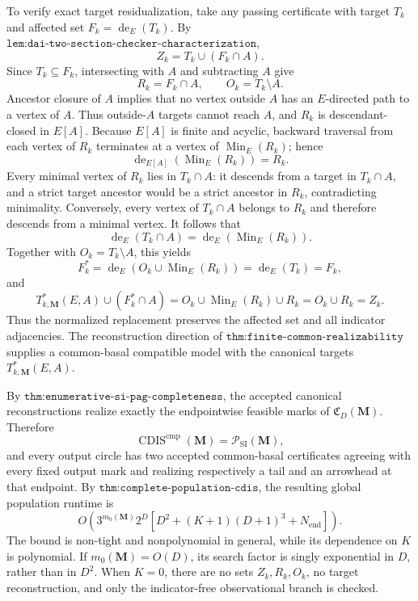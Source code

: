 To verify exact target residualization, take any passing certificate with target \(T_k\) and affected set \(F_k=\operatorname{de}_E(T_k)\).  By \(\texttt{lem:dai-two-section-checker-characterization}\),
\[
Z_k=T_k\cup(F_k\cap A).
\]
Since \(T_k\subseteq F_k\), intersecting with \(A\) and subtracting \(A\) give
\[
R_k=F_k\cap A,
\qquad
O_k=T_k\setminus A.
\]
Ancestor closure of \(A\) implies that no vertex outside \(A\) has an \(E\)-directed path to a vertex of \(A\).  Thus outside-\(A\) targets cannot reach \(A\), and \(R_k\) is descendant-closed in \(E[A]\).  Because \(E[A]\) is finite and acyclic, backward traversal from each vertex of \(R_k\) terminates at a vertex of \(\operatorname{Min}_E(R_k)\); hence
\[
\operatorname{de}_{E[A]}\!\left(\operatorname{Min}_E(R_k)\right)=R_k.
\]
Every minimal vertex of \(R_k\) lies in \(T_k\cap A\): it descends from a target in \(T_k\cap A\), and a strict target ancestor would be a strict ancestor in \(R_k\), contradicting minimality.  Conversely, every vertex of \(T_k\cap A\) belongs to \(R_k\) and therefore descends from a minimal vertex.  It follows that
\[
\operatorname{de}_E(T_k\cap A)
=\operatorname{de}_E\!\left(\operatorname{Min}_E(R_k)\right).
\]
Together with \(O_k=T_k\setminus A\), this yields
\[
F_k^*
=\operatorname{de}_E\!\left(O_k\cup\operatorname{Min}_E(R_k)\right)
=\operatorname{de}_E(T_k)
=F_k,
\]
and
\[
T^*_{k,\mathbf M}(E,A)\cup(F_k^*\cap A)
=O_k\cup\operatorname{Min}_E(R_k)\cup R_k
=O_k\cup R_k
=Z_k.
\]
Thus the normalized replacement preserves the affected set and all indicator adjacencies.  The reconstruction direction of \(\texttt{thm:finite-common-realizability}\) supplies a common-basal compatible model with the canonical targets \(T^*_{k,\mathbf M}(E,A)\).

By \(\texttt{thm:enumerative-si-pag-completeness}\), the accepted canonical reconstructions realize exactly the endpointwise feasible marks of \(\mathfrak C_D(\mathbf M)\).  Therefore
\[
\operatorname{CDIS}^{\mathrm{cmp}}(\mathbf M)=\mathcal P_{\mathrm{SI}}(\mathbf M),
\]
and every output circle has two accepted common-basal certificates agreeing with every fixed output mark and realizing respectively a tail and an arrowhead at that endpoint.  By \(\texttt{thm:complete-population-cdis}\), the resulting global population runtime is
\[
O\!\left(
3^{m_0(\mathbf M)}2^D
\left[D^2+(K+1)(D+1)^3+N_{\mathrm{end}}\right]
\right).
\]
The bound is non-tight and nonpolynomial in general, while its dependence on \(K\) is polynomial.  If \(m_0(\mathbf M)=O(D)\), its search factor is singly exponential in \(D\), rather than in \(D^2\).  When \(K=0\), there are no sets \(Z_k,R_k,O_k\), no target reconstruction, and only the indicator-free observational branch is checked.


